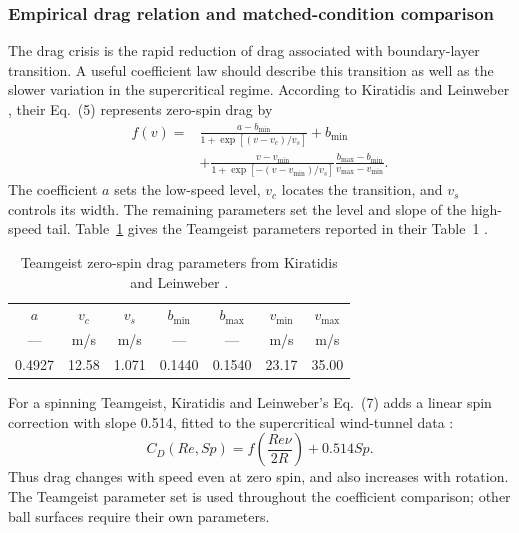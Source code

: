 \documentclass[12pt,letterpaper]{article}
\begin{document}
\subsubsection{Empirical drag relation and matched-condition comparison}
The drag crisis is the rapid reduction of drag associated with boundary-layer transition. A useful coefficient law should describe this transition as well as the slower variation in the supercritical regime. According to Kiratidis and Leinweber \cite{kiratidis2018}, their Eq.~(5) represents zero-spin drag by
\begin{equation}
\begin{aligned}
f(v)={}&\frac{a-b_{\min}}{1+\exp[(v-v_c)/v_s]}+b_{\min}\\
&+\frac{v-v_{\min}}{1+\exp[-(v-v_{\min})/v_s]}
\frac{b_{\max}-b_{\min}}{v_{\max}-v_{\min}}.
\end{aligned}
\label{eq:cd-zero}\end{equation}
The coefficient $a$ sets the low-speed level, $v_c$ locates the transition, and $v_s$ controls its width. The remaining parameters set the level and slope of the high-speed tail. Table~\ref{tab:teamgeist} gives the Teamgeist parameters reported in their Table~1 \cite{kiratidis2018}.
\begin{table}[H]\centering
\caption{Teamgeist zero-spin drag parameters from Kiratidis and Leinweber \cite{kiratidis2018}.}\label{tab:teamgeist}
\begin{tabular}{ccccccc}\toprule
$a$ & $v_c$ & $v_s$ & $b_{\min}$ & $b_{\max}$ & $v_{\min}$ & $v_{\max}$\\
--- & m/s & m/s & --- & --- & m/s & m/s\\\midrule
0.4927 & 12.58 & 1.071 & 0.1440 & 0.1540 & 23.17 & 35.00\\\bottomrule
\end{tabular}\end{table}
For a spinning Teamgeist, Kiratidis and Leinweber's Eq.~(7) adds a linear spin correction with slope 0.514, fitted to the supercritical wind-tunnel data \cite{kiratidis2018}:
\begin{equation}
C_D(Re,Sp)=f\!\left(\frac{Re\nu}{2R}\right)+0.514Sp.
\label{eq:cd-full}\end{equation}
Thus drag changes with speed even at zero spin, and also increases with rotation. The Teamgeist parameter set is used throughout the coefficient comparison; other ball surfaces require their own parameters.
\end{document}
